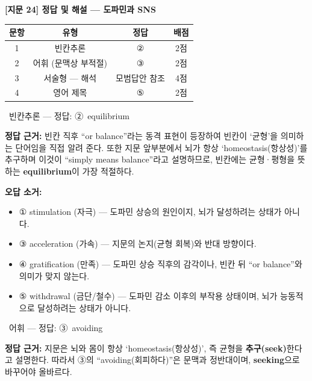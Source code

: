 \documentclass[11pt,a4paper]{article}
\newcommand{\qno}[1]{\par\vspace{10pt}\noindent{\sffamily\bfseries #1.}\ }
\newcommand{\instr}[1]{{\sffamily #1}\par\vspace{3pt}}
\begin{document}
\begin{center}
{\fontsize{15}{17}\selectfont\sffamily\bfseries [지문 24] 정답 및 해설 — 도파민과 SNS}
\end{center}
\vspace{6pt}

\begin{center}
\renewcommand{\arraystretch}{1.4}
\begin{tabular}{cccc}
\toprule
문항 & 유형 & 정답 & 배점 \\
\midrule
1 & 빈칸추론 & ② & 2점 \\
2 & 어휘 (문맥상 부적절) & ③ & 2점 \\
3 & 서술형 — 해석 & 모범답안 참조 & 4점 \\
4 & 영어 제목 & ⑤ & 2점 \\
\bottomrule
\end{tabular}
\end{center}

\vspace{8pt}

\qno{1}\instr{빈칸추론 — 정답: ②\, equilibrium}

\noindent\textbf{정답 근거:} 빈칸 직후 ``or balance''라는 동격 표현이 등장하여 빈칸이 `균형'을 의미하는 단어임을 직접 알려 준다. 또한 지문 앞부분에서 뇌가 항상 `homeostasis(항상성)'를 추구하며 이것이 ``simply means balance''라고 설명하므로, 빈칸에는 균형·평형을 뜻하는 \textbf{equilibrium}이 가장 적절하다.

\vspace{4pt}\noindent\textbf{오답 소거:}
\begin{itemize}[leftmargin=2em,itemsep=1pt,topsep=2pt]
  \item ① stimulation (자극) — 도파민 상승의 원인이지, 뇌가 달성하려는 상태가 아니다.
  \item ③ acceleration (가속) — 지문의 논지(균형 회복)와 반대 방향이다.
  \item ④ gratification (만족) — 도파민 상승 직후의 감각이나, 빈칸 뒤 ``or balance''와 의미가 맞지 않는다.
  \item ⑤ withdrawal (금단/철수) — 도파민 감소 이후의 부작용 상태이며, 뇌가 능동적으로 달성하려는 상태가 아니다.
\end{itemize}

\qno{2}\instr{어휘 — 정답: ③\, avoiding}

\noindent\textbf{정답 근거:} 지문은 뇌와 몸이 항상 `homeostasis(항상성)', 즉 균형을 \textbf{추구(seek)}한다고 설명한다. 따라서 ③의 ``avoiding(회피하다)''은 문맥과 정반대이며, \textbf{seeking}으로 바꾸어야 올바르다.
\end{document}
